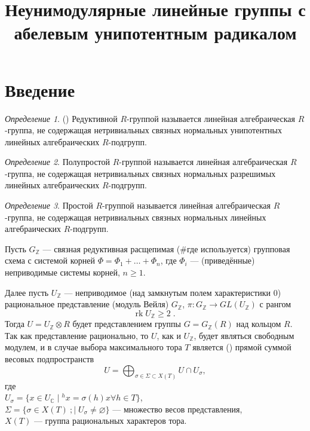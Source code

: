 \documentclass[10pt]{article}
\title{Неунимодулярные линейные группы с абелевым унипотентным радикалом}
\author{}
\date{}
\theoremstyle{remark}
\newtheorem{definition}{Определение}
\newcommand{\Z}{\mathbb{Z}}
\renewcommand{\C}{\mathbb{C}}
\renewcommand{\ge}{\geqslant}
\begin{document}
\maketitle


\section{Введение}


\begin{definition} (\cite{Conrad11reductivegroup})
Редуктивной $R$-группой называется линейная алгебраическая $R$-группа, не содержащая нетривиальных связных нормальных унипотентных линейных алгебраических $R$-подгрупп.
\end{definition}

\begin{definition}
Полупростой $R$-группой называется линейная алгебраическая $R$-группа, не содержащая нетривиальных связных нормальных разрешимых линейных алгебраических $R$-подгрупп.
\end{definition}

\begin{definition}
Простой $R$-группой называется линейная алгебраическая $R$-группа, не содержащая нетривиальных связных нормальных линейных алгебраических $R$-подгрупп.
\end{definition}

Пусть $G_\Z$ --- связная редуктивная расщепимая (\#где используется) групповая схема с системой корней $\Phi = \Phi_1 + \dots + \Phi_n$, где $\Phi_i$ --- (приведённые) неприводимые системы корней, $n \ge 1$.

Далее пусть $U_\Z$ --- неприводимое (над замкнутым полем характеристики $0$) рациональное представление (модуль Вейля) $G_\Z$, $\pi:G_\Z \to GL(U_\Z)$ с рангом
\begin{equation}\label{representationrank}\mathrm{rk} \; U_\Z \ge 2 \;. \end{equation}
Тогда $U=U_\Z\otimes R$ будет представлением группы $G=G_\Z(R)$ над кольцом $R$. Так как представление рационально, то $U$, как и $U_\Z$, будет являться свободным модулем, и в случае выбора максимального тора $T$ является (\citep{Borel1970}) прямой суммой весовых подпространств
$$U=\bigoplus_{\sigma \in \Sigma \subset X(T)} {U \cap U_\sigma} ,$$
где\\
$U_\sigma = \{x \in U_\C \; | \; ^h x = \sigma(h) x \forall h \in T \}$,\\
$\Sigma = \{\sigma \in X(T) \
; | \; U_\sigma \ne \varnothing\}$ --- множество весов представления,\\
$X(T)$ --- группа рациональных характеров тора.
\end{document}
